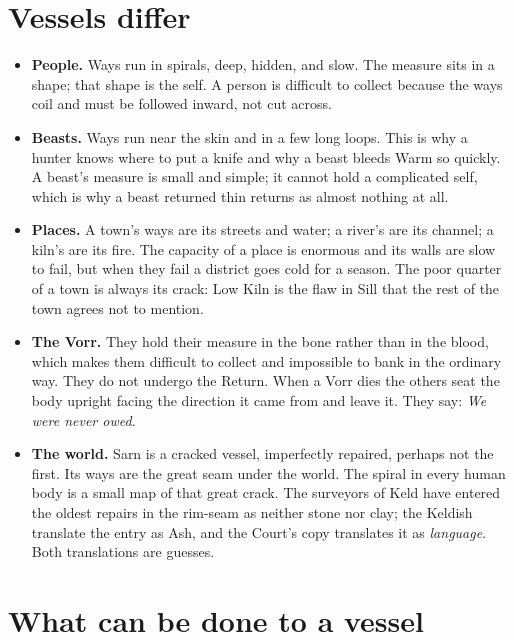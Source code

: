 \documentclass{design/chronicle}
\begin{document}
\section*{Vessels differ}

\begin{itemize}[leftmargin=1.4em,itemsep=1pt,topsep=3pt,parsep=0pt]

\item \textbf{People.} Ways run in spirals, deep, hidden, and slow. The measure sits in a shape; that shape is the self. A person is difficult to collect because the ways coil and must be followed inward, not cut across.

\item \textbf{Beasts.} Ways run near the skin and in a few long loops. This is why a hunter knows where to put a knife and why a beast bleeds Warm so quickly. A beast’s measure is small and simple; it cannot hold a complicated self, which is why a beast returned thin returns as almost nothing at all.

\item \textbf{Places.} A town’s ways are its streets and water; a river’s are its channel; a kiln’s are its fire. The capacity of a place is enormous and its walls are slow to fail, but when they fail a district goes cold for a season. The poor quarter of a town is always its crack: Low Kiln is the flaw in Sill that the rest of the town agrees not to mention.

\item \textbf{The Vorr.} They hold their measure in the bone rather than in the blood, which makes them difficult to collect and impossible to bank in the ordinary way. They do not undergo the Return. When a Vorr dies the others seat the body upright facing the direction it came from and leave it. They say: \emph{We were never owed.}

\item \textbf{The world.} Sarn is a cracked vessel, imperfectly repaired, perhaps not the first. Its ways are the great seam under the world. The spiral in every human body is a small map of that great crack. The surveyors of Keld have entered the oldest repairs in the rim-seam as neither stone nor clay; the Keldish translate the entry as Ash, and the Court’s copy translates it as \emph{language}. Both translations are guesses.

\end{itemize}

\section*{What can be done to a vessel}
\end{document}
